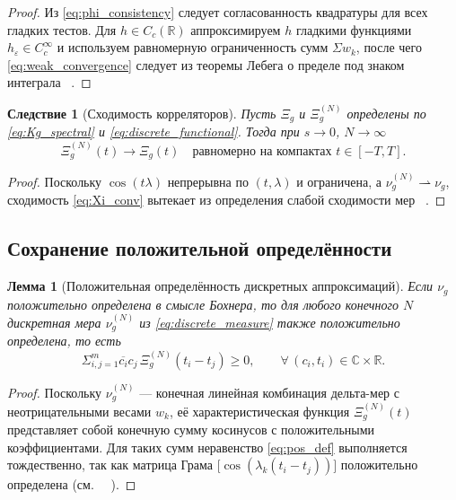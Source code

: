 \documentclass{article}
\numberwithin{equation}{section}
\theoremstyle{plain}
\newtheorem{lemma}{Лемма}
\newtheorem{corollary}{Следствие}
\theoremstyle{definition}
\theoremstyle{remark}
\def\infty{∞}\def\partial{∂}\def\sum{Σ}\def\int{∫}%
\begin{document}
\begin{proof}
Из \eqref{eq:phi_consistency} следует согласованность квадратуры для всех гладких тестов.
Для $h\in C_c(\mathbb R)$ аппроксимируем $h$ гладкими функциями $h_\varepsilon\in C_c^\infty$
и используем равномерную ограниченность сумм $\sum w_k$, после чего
\eqref{eq:weak_convergence} следует из теоремы Лебега о пределе под знаком интеграла ~\cite{Grenander1981}.
\end{proof}

\begin{corollary}[Сходимость корреляторов]
\label{cor:correlator_conv}
Пусть $\Xi_g$ и $\Xi_g^{(N)}$ определены по \eqref{eq:Kg_spectral} и \eqref{eq:discrete_functional}.
Тогда при $s\to0$, $N\to\infty$
\begin{equation}
\label{eq:Xi_conv}
\Xi_g^{(N)}(t)\longrightarrow \Xi_g(t)
\quad\text{равномерно на компактах } t\in[-T,T].
\end{equation}
\end{corollary}

\begin{proof}
Поскольку $\cos(t\lambda)$ непрерывна по $(t,\lambda)$ и ограничена, 
а $\nu_g^{(N)}\rightharpoonup\nu_g$, сходимость \eqref{eq:Xi_conv} вытекает из 
определения слабой сходимости мер ~\cite{Levy1937}.
\end{proof}

\subsection{Сохранение положительной определённости}
\label{subsec:positive_definiteness}

\begin{lemma}[Положительная определённость дискретных аппроксимаций]
\label{lem:positive_def}
Если $\nu_g$ положительно определена в смысле Бохнера, то для любого конечного $N$
дискретная мера $\nu_g^{(N)}$ из \eqref{eq:discrete_measure} также положительно определена, то есть
\begin{equation}
\label{eq:pos_def}
\sum_{i,j=1}^m \overline{c_i}c_j \,\Xi_g^{(N)}(t_i-t_j) \ge 0,
\qquad \forall\,(c_i,t_i)\in\mathbb C\times\mathbb R.
\end{equation}
\end{lemma}

\begin{proof}
Поскольку $\nu_g^{(N)}$ --- конечная линейная комбинация дельта-мер с неотрицательными весами $w_k$,
её характеристическая функция $\Xi_g^{(N)}(t)$ представляет собой конечную сумму косинусов
с положительными коэффициентами. Для таких сумм неравенство \eqref{eq:pos_def}
выполняется тождественно, так как матрица Грама $\big[\cos(\lambda_k(t_i-t_j))\big]$
положительно определена (см.~\cite{Bochner1933} ~\cite{Schoenberg1938}).
\end{proof}
\end{document}

